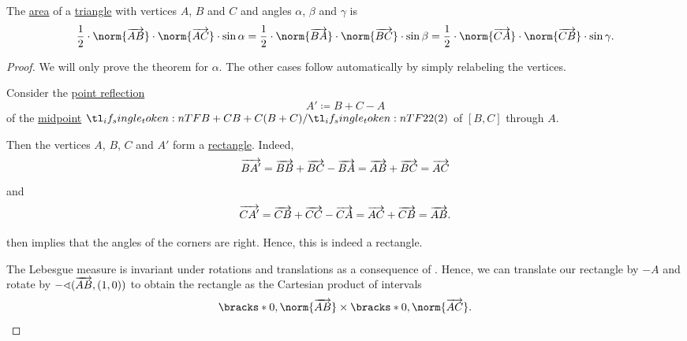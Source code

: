 \begin{proposition}\label{thm:area_of_triangle}
  The \hyperref[def:figure_area]{area} of a \hyperref[def:triangle]{triangle} with vertices \( A \), \( B \) and \( C \) and angles \( \alpha \), \( \beta \) and \( \gamma \) is
  \begin{equation}\label{eq:thm:area_of_triangle}
    \frac 1 2 \cdot \norm{\vect{AB}} \cdot \norm{\vect{AC}} \cdot \sin \alpha = \frac 1 2 \cdot \norm{\vect{BA}} \cdot \norm{\vect{BC}} \cdot \sin \beta = \frac 1 2 \cdot \norm{\vect{CA}} \cdot \norm{\vect{CB}} \cdot \sin \gamma.
  \end{equation}
\end{proposition}
\begin{proof}
  We will only prove the theorem for \( \alpha \). The other cases follow automatically by simply relabeling the vertices.

   Consider the \hyperref[def:rigid_motion/point_reflection]{point reflection}
  \begin{equation*}
    A' \coloneqq B + C - A
  \end{equation*}
  of the \hyperref[thm:segment_midpoint]{midpoint} \( \ifrac {B + C} 2 \) of \( [B, C] \) through \( A \).

  Then the vertices \( A \), \( B \), \( C \) and \( A' \) form a \hyperref[def:parallelogram/rectangle]{rectangle}. Indeed,
  \begin{equation*}
    \overrightarrow{BA'} = \overrightarrow{BB} + \overrightarrow{BC} - \overrightarrow{BA} = \overrightarrow{AB} + \overrightarrow{BC} = \overrightarrow{AC}
  \end{equation*}
  and
  \begin{equation*}
    \overrightarrow{CA'} = \overrightarrow{CB} + \overrightarrow{CC} - \overrightarrow{CA} = \overrightarrow{AC} + \overrightarrow{CB} = \overrightarrow{AB}.
  \end{equation*}

   then implies that the angles of the corners are right. Hence, this is indeed a rectangle.

  The Lebesgue measure is invariant under rotations and translations as a consequence of . Hence, we can translate our rectangle by \( -A \) and rotate by \( -\sphericalangle(\overrightarrow{AB}, (1, 0)) \) to obtain the rectangle as the Cartesian product of intervals
  \begin{equation*}
    \bracks*{ 0, \norm{\vect{AB}} } \times \bracks*{ 0, \norm{\vect{AC}} }.
  \end{equation*}


\end{proof}
